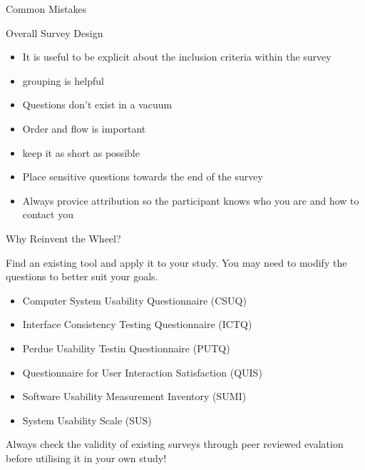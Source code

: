 \documentclass[ignorenonframetext,]{beamer}
\providecommand{\tightlist}{%
  \setlength{\itemsep}{0pt}\setlength{\parskip}{0pt}}
\begin{document}
\begin{frame}
\begin{block}{ Common Mistakes}
\end{block}

\begin{block}{Overall Survey Design}

\begin{itemize}
\tightlist
\item
  It is useful to be explicit about the inclusion criteria within the
  survey
\item
  grouping is helpful
\item
  Questions don't exist in a vacuum
\item
  Order and flow is important
\item
  keep it as short as possible
\item
  Place sensitive questions towards the end of the survey
\item
  Always provice attribution so the participant knows who you are and
  how to contact you
\end{itemize}

\end{block}

\begin{block}{Why Reinvent the Wheel?}

Find an existing tool and apply it to your study. You may need to modify
the questions to better suit your goals.

\begin{itemize}
\tightlist
\item
  Computer System Usability Questionnaire (CSUQ)
\item
  Interface Consistency Testing Questionnaire (ICTQ)
\item
  Perdue Usability Testin Questionnaire (PUTQ)
\item
  Questionnaire for User Interaction Satisfaction (QUIS)
\item
  Software Usability Measurement Inventory (SUMI)
\item
  System Usability Scale (SUS)
\end{itemize}

Always check the validity of existing surveys through peer reviewed
evalation before utilising it in your own study!

\end{block}

\end{frame}
\end{document}
